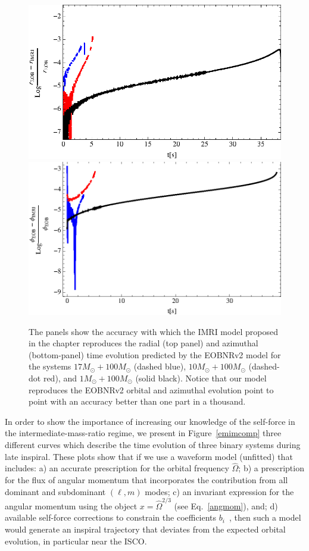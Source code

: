 \begin{figure}%
\includegraphics[height=0.6\textwidth,  clip]{figures/insimri/radacc}
\includegraphics[height=0.6\textwidth,  clip]{figures/insimri/phaacc}
\caption{The panels show the accuracy with which the IMRI model proposed in the chapter reproduces the radial (top panel) and azimuthal (bottom-panel) time evolution predicted by the EOBNRv2 model for the systems  \(17M_{\odot} + 100M_{\odot}\) (dashed blue), \(10M_{\odot} + 100M_{\odot}\) (dashed-dot red), and \(1M_{\odot} + 100M_{\odot}\) (solid black). Notice that our model reproduces the EOBNRv2 orbital and azimuthal evolution point to point with an accuracy better than  one part in a thousand. }
\label{randphiaccuracy}
\end{figure}



In order to show the importance of increasing our knowledge of the self-force in the intermediate-mass-ratio regime, we present in Figure~\ref{emimcomp}  three different curves which describe the time evolution of three binary systems during late inspiral. These plots show that if we use a waveform model (unfitted) that includes: a) an accurate prescription for the orbital frequency \(\hat\Omega\); b) a prescription for the flux of angular momentum that incorporates the contribution from all dominant and subdominant \((\ell,m)\) modes; c) an invariant expression for the angular momentum using the object \(x=\hat\Omega^{2/3}\) (see  Eq.~\eqref{angmom}), and; d) available self-force corrections to constrain the coefficients \(b_i\)~\cite{barus}, then such a model would generate an inspiral trajectory that deviates from the expected orbital evolution, in particular near the ISCO. 



